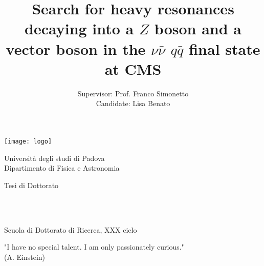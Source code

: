 \documentclass[11pt, a4paper]{book}
\title{Search for heavy resonances decaying into a $Z$ boson and a vector boson in the $\nu \bar{\nu}$ $q\bar{q}$ final state at CMS}
\date{}
\author{Supervisor: Prof. Franco Simonetto \\ Candidate: Lisa Benato} %
\affil{Universit\`a degli studi di Padova}
\begin{document}
\begin{titlingpage} %
\begin{center}
\texttt{[image: logo]}\\ %
\begin{large}
Universit\`a degli studi di Padova \\ %
Dipartimento di Fisica e Astronomia\\
\end{large}
\vspace{1.5cm} %
\begin{large}
Tesi di Dottorato \\
\end{large}
\vspace{1.5cm}
\begin{tcolorbox}[breakable,colback=black!5!white,colframe=red!80!black,width=\textwidth]
\begin{center}
\begin{Huge} 
{\color{red!80!black}\textbf{\thetitle}} \\
\end{Huge}
\end{center}
\end{tcolorbox}
\vspace{3.5cm}
\theauthor\\
\vspace{5cm} %
Scuola di Dottorato di Ricerca, XXX ciclo
\end{center}
\end{titlingpage}

\newpage\null\thispagestyle{empty}\newpage
\thispagestyle{empty}
\begin{flushright}
\null{}
"I have no special talent. I am only passionately curious."\\
(A. Einstein)
\null
\end{flushright}

\newpage\null\thispagestyle{empty}\newpage
\thispagestyle{empty}

\frontmatter %
\tableofcontents
\end{document}
